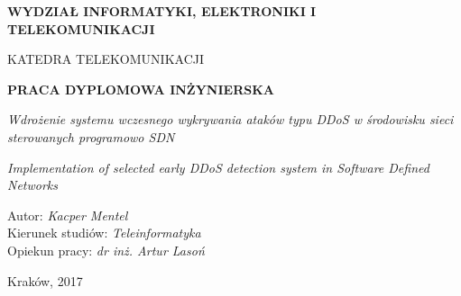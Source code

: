 \newpage
\thispagestyle{empty}
\mbox{}
    \begin{center}
        \vspace*{1cm}
        
        \large
        \textbf{WYDZIAŁ INFORMATYKI, ELEKTRONIKI I TELEKOMUNIKACJI}
        
        \vspace{0.8cm}
        KATEDRA TELEKOMUNIKACJI

        \vspace{4cm}
        \Large
        \textbf{PRACA DYPLOMOWA INŻYNIERSKA}

        \vspace{0.8cm}
        \large
        \textit{Wdrożenie systemu wczesnego wykrywania ataków typu DDoS w środowisku
        sieci sterowanych programowo SDN}

        \vspace{0.5cm}
        \small
        \textit{Implementation of selected early DDoS detection system in
          Software Defined Networks}

      \end{center}

        \vfill
        
        \noindent
        Autor: \textit{Kacper Mentel}\\
        Kierunek studiów: \textit{Teleinformatyka}\\
        Opiekun pracy: \textit{dr inż. Artur Lasoń}\\

      \begin{center}
        Kraków, 2017
      \end{center}
